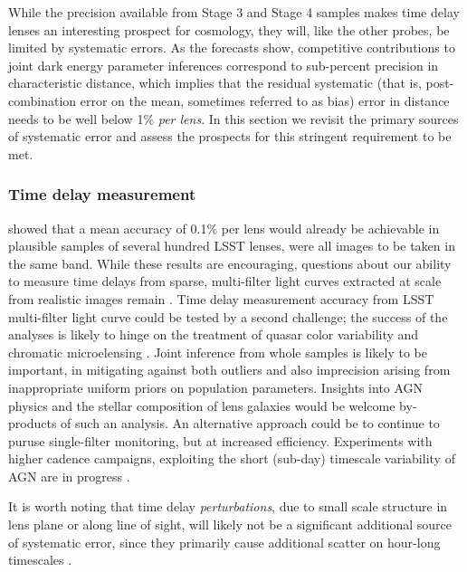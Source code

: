While the precision available from Stage 3 and Stage 4 samples makes
time delay lenses an interesting prospect for cosmology, they will,
like the other probes, be limited by systematic errors. As the
forecasts show, competitive contributions to joint dark energy
parameter inferences correspond to sub-percent precision in
characteristic distance, which implies that the residual systematic
(that is, post-combination error on the mean, sometimes referred to as
bias) error in distance needs to be well below 1\% {\it per lens}. In
this section we revisit the primary sources of systematic error and
assess the prospects for this stringent requirement to be met.

\subsubsection{Time delay measurement}

\citet{LiaoEtal2015} showed that a
mean accuracy of 0.1\% per lens would already be achievable in
plausible samples of several hundred LSST lenses, were all images to
be taken in the same band.  While these results are encouraging,
questions about our ability to measure time delays from sparse,
multi-filter light curves extracted at scale from realistic images
remain \citep{TCM13}.  Time delay measurement accuracy from LSST
multi-filter light curve could be tested by a second challenge; the
success of the analyses is likely to hinge on the treatment of quasar
color variability \citep[see e.g.\ ][and references
therein]{Sch++12,SunEtal2014} and chromatic microelensing
\citep[see e.g.][and references therein]{HainlineEtal2013}.
Joint inference from whole samples is likely to
be important, in mitigating against both outliers and also imprecision
arising from inappropriate uniform priors on  population parameters.
Insights into AGN physics and the stellar composition  of lens galaxies
would be welcome by-products of such an analysis. An alternative approach
could be to continue to puruse single-filter monitoring, but at
increased efficiency. Experiments with higher cadence campaigns,
exploiting the short (sub-day) timescale variability of AGN are in
progress \citep[][F.~Courbin, priv.\ comm.]{BorosonEtal2016}.

It is worth noting that time delay {\it perturbations},  due to small
scale structure in lens plane or along line of sight, will likely not be
a significant  additional source of systematic error, since they
primarily cause additional  scatter on hour-long timescales
\citep{K+M09}.


